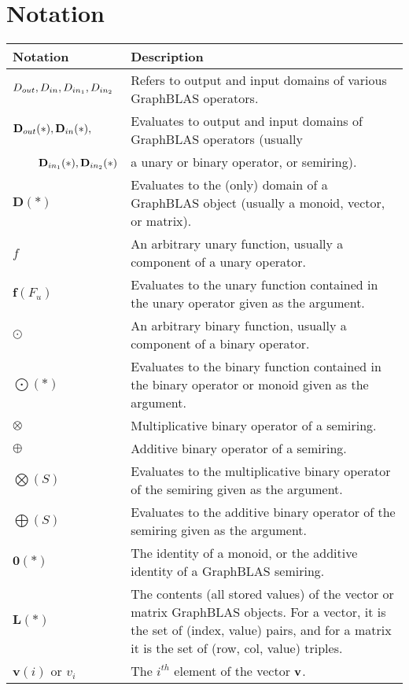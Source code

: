 \vfill


\section{Notation}

\begin{tabular}[H]{l|p{5in}}
Notation & Description \\
\hline
$\mbox{$D_{out}$}, \mbox{$D_{in}$}, \mbox{$D_{in_{1}}$}, \mbox{$D_{in_{2}}$}$  & Refers to output and input domains of various GraphBLAS operators. \\
$\mbox{$\mathbf{D}_{out}$}(*), \mbox{$\mathbf{D}_{in}$}(*),$ & Evaluates to output and input domains of GraphBLAS operators (usually \\
~~~~$\mbox{$\mathbf{D}_{in_{1}}$}(*), \mbox{$\mathbf{D}_{in_{2}}$}(*)$ & a unary or binary operator, or semiring). \\
$\mathbf{D}(*)$   & Evaluates to the (only) domain of a GraphBLAS object (usually a monoid, vector, or matrix). \\ 
$f$             & An arbitrary unary function, usually a component of a unary operator. \\
$\mathbf{f}(F_u)$ & Evaluates to the unary function contained in the unary operator given as the argument. \\
$\odot$         & An arbitrary binary function, usually a component of a binary operator. \\
$\mathbf{\bigodot}(*)$ & Evaluates to the binary function contained in the binary operator or monoid given as the argument. \\
$\otimes$       & Multiplicative binary operator of a semiring. \\
$\oplus$        & Additive binary operator of a semiring. \\
$\mathbf{\bigotimes}(S)$ & Evaluates to the multiplicative binary operator of the semiring given as the argument. \\
$\mathbf{\bigoplus}(S)$ & Evaluates to the additive binary operator of the semiring given as the argument. \\
$\mathbf{0}(*)$   & The identity of a monoid, or the additive identity of a GraphBLAS semiring. \\
$\mathbf{L}(*)$   & The contents (all stored values) of the vector or matrix GraphBLAS objects.  For a vector, it is the set of (index, value) pairs, and for a matrix it is the set of (row, col, value) triples. \\
$\mathbf{v}(i)$ or $v_i$   & The $i^{th}$ element of the vector ${\bf v}$.\\

\end{tabular}
